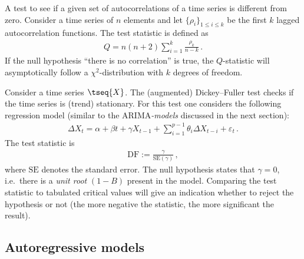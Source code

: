     \begin{method}
        A test to see if a given set of autocorrelations of a time series is different from zero. Consider a time series of $n$ elements and let $\{\rho_i\}_{1\leq i\leq k}$ be the first $k$ lagged autocorrelation functions. The test statistic is defined as
        \begin{gather}
            Q = n(n+2)\sum_{i=1}^k\frac{\rho_k}{n-k}\,.
        \end{gather}
        If the null hypothesis ``there is no correlation'' is true, the $Q$-statistic will asymptotically follow a $\chi^2$-distribution with $k$ degrees of freedom.
    \end{method}

    \begin{method}
        Consider a time series $\tseq{X}$. The (augmented) Dickey--Fuller test checks if the time series is (trend) stationary. For this test one considers the following regression model (similar to the ARIMA\textit{-models} discussed in the next section):
        \begin{gather}
            \Delta X_t = \alpha + \beta t + \gamma X_{t-1} + \sum_{i=1}^{p-1} \theta_i\Delta X_{t-i} + \varepsilon_t\,.
        \end{gather}
        The test statistic is
        \begin{gather}
            \mathrm{DF} := \frac{\gamma}{\mathrm{SE}(\gamma)}\,,
        \end{gather}
        where $\mathrm{SE}$ denotes the standard error. The null hypothesis states that $\gamma=0$, i.e.~there is a \textit{unit root} $(1-B)$ present in the model. Comparing the test statistic to tabulated critical values will give an indication whether to reject the hypothesis or not (the more negative the statistic, the more significant the result).
    \end{method}

\subsection{Autoregressive models}


